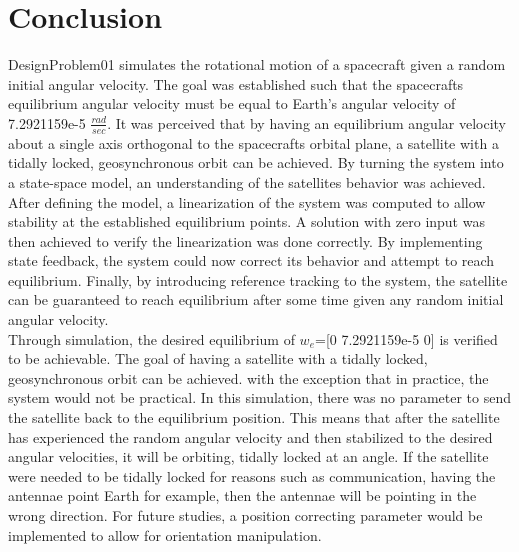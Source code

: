 \documentclass[12pt]{article}
\begin{document}
\section{Conclusion}
DesignProblem01 simulates the rotational motion of a spacecraft given a random initial angular velocity. The goal was established such that the spacecrafts equilibrium angular velocity must be equal to Earth's angular velocity of 7.2921159e-5 \( \frac{rad}{sec} \). It was perceived that by having an equilibrium angular velocity about a single axis orthogonal to the spacecrafts orbital plane, a satellite with a tidally locked, geosynchronous orbit can be achieved. By turning the system into a state-space model, an understanding of the satellites behavior was achieved. After defining the model, a linearization of the system was computed to allow stability at the established equilibrium points. A solution with zero input was then achieved to verify the linearization was done correctly. By implementing state feedback, the system could now correct its behavior and attempt to reach equilibrium. Finally, by introducing reference tracking to the system, the satellite can be guaranteed to reach equilibrium after some time given any random initial angular velocity. 
\\
Through simulation, the desired equilibrium of ${w}_{e}$=[0 7.2921159e-5 0] is verified to be achievable. The goal of having a satellite with a tidally locked, geosynchronous orbit can be achieved. with the exception that in practice, the system would not be practical. In this simulation, there was no parameter to send the satellite back to the equilibrium position. This means that after the satellite has experienced the random angular velocity and then stabilized to the desired angular velocities, it will be orbiting, tidally locked at an angle. If the satellite were needed to be tidally locked for reasons such as communication, having the antennae point Earth for example, then the antennae will be pointing in the wrong direction. For future studies, a position correcting parameter would be implemented to allow for orientation manipulation. 
\end{document}
